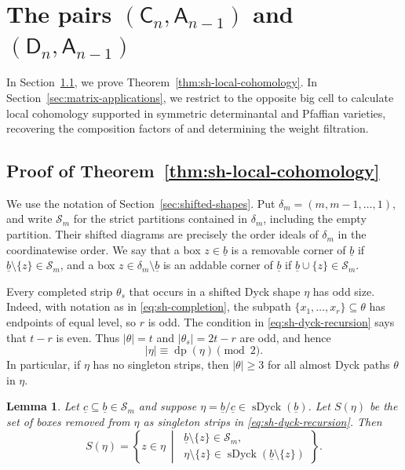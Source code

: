 \documentclass[12pt]{amsart}
\renewcommand{\b}{\underline{b}}
\newcommand{\mc}[1]{\mathcal{#1}}
\newcommand{\defi}[1]{{\upshape\sffamily #1}}
\newtheorem{lemma}[theorem]{Lemma}
\theoremstyle{definition}
\numberwithin{equation}{section}
\begin{document}
\section{The pairs $(\mathsf{C}_n,\mathsf{A}_{n-1})$ and $(\mathsf{D}_n,\mathsf{A}_{n-1})$}\label{sec:shifted-pairs}

In Section~\ref{sec:shifted-proof}, we prove Theorem~\ref{thm:sh-local-cohomology}.
In Section~\ref{sec:matrix-applications}, we restrict to the
opposite big cell to calculate local cohomology supported in
symmetric determinantal and Pfaffian varieties, recovering
the composition factors of \cite{raicu2016local} and
determining the weight filtration.


\subsection{Proof of Theorem~\ref{thm:sh-local-cohomology}}
\label{sec:shifted-proof}


We use the notation of Section~\ref{sec:shifted-shapes}.
Put $\delta_m=(m,m-1,\ldots,1)$, and write $\mc S_m$ for
the strict partitions contained in $\delta_m$, including
the empty partition. Their shifted diagrams are precisely
the order ideals of $\delta_m$ in the coordinatewise order.
We say that a box $z\in\b$ is a \defi{removable corner} of $\b$ if
$\b\setminus\{z\}\in\mc S_m$, and a box
$z\in\delta_m\setminus\b$ is an \defi{addable corner} of $\b$
if $\b\cup\{z\}\in\mc S_m$. 

Every completed strip $\theta_s$ that occurs in a shifted Dyck shape $\eta$ has odd
size. Indeed, with notation as in \eqref{eq:sh-completion},
the subpath $\{x_1,\ldots,x_r\}\subseteq \theta$ has endpoints of equal level,
so $r$ is odd. The condition in \eqref{eq:sh-dyck-recursion}
says that $t-r$ is even. Thus $|\theta|=t$ and
$|\theta_s|=2t-r$ are odd, and hence
\begin{equation}\label{eq:sh-depth-parity}
|\eta|\equiv\operatorname{dp}(\eta)\pmod2.
\end{equation}
In particular, if $\eta$ has no singleton strips, then $|\theta|\geq3$ for all almost Dyck paths $\theta$ in $\eta$.

\begin{lemma}\label{lem:sh-corner-removal}
Let $\underline c\subseteq\b\in\mc S_m$ and suppose
$\eta=\b/\underline c\in\operatorname{sDyck}(\b)$.
Let $S(\eta)$ be the set of boxes removed from $\eta$ as singleton strips
in \eqref{eq:sh-dyck-recursion}. Then
\begin{equation}\label{eq:sh-corner-removal}
S(\eta)=\left\{z\in\eta\ \middle|\
\begin{gathered}
\b\setminus\{z\}\in\mc S_m,\\
\eta\setminus\{z\}\in
\operatorname{sDyck}(\b\setminus\{z\})
\end{gathered}\right\}.
\end{equation}
\end{lemma}
\end{document}
